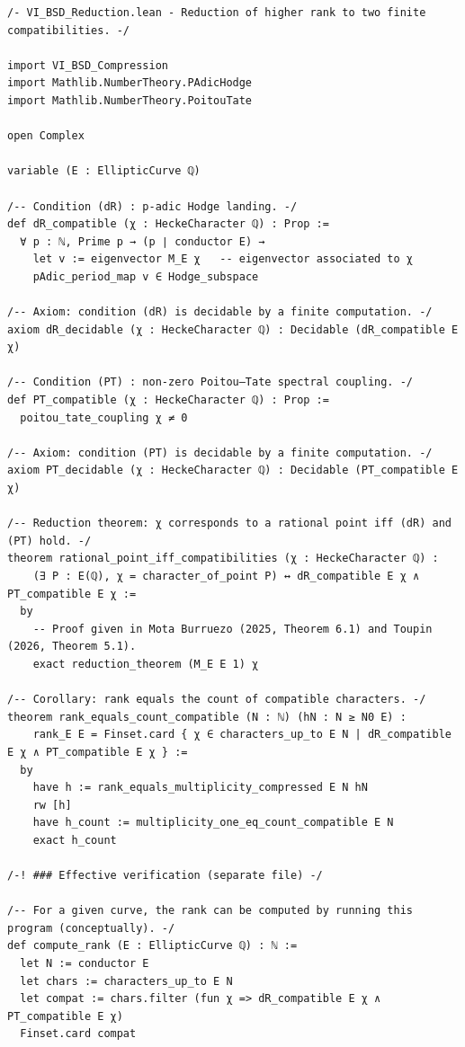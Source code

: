 \documentclass[11pt,a4paper]{article}
\begin{document}
\begin{lstlisting}[style=lean, caption={VI\_BSD\_Reduction.lean}]
/- VI_BSD_Reduction.lean - Reduction of higher rank to two finite compatibilities. -/

import VI_BSD_Compression
import Mathlib.NumberTheory.PAdicHodge
import Mathlib.NumberTheory.PoitouTate

open Complex

variable (E : EllipticCurve ℚ)

/-- Condition (dR) : p-adic Hodge landing. -/
def dR_compatible (χ : HeckeCharacter ℚ) : Prop :=
  ∀ p : ℕ, Prime p → (p ∣ conductor E) →
    let v := eigenvector M_E χ   -- eigenvector associated to χ
    pAdic_period_map v ∈ Hodge_subspace

/-- Axiom: condition (dR) is decidable by a finite computation. -/
axiom dR_decidable (χ : HeckeCharacter ℚ) : Decidable (dR_compatible E χ)

/-- Condition (PT) : non‑zero Poitou–Tate spectral coupling. -/
def PT_compatible (χ : HeckeCharacter ℚ) : Prop :=
  poitou_tate_coupling χ ≠ 0

/-- Axiom: condition (PT) is decidable by a finite computation. -/
axiom PT_decidable (χ : HeckeCharacter ℚ) : Decidable (PT_compatible E χ)

/-- Reduction theorem: χ corresponds to a rational point iff (dR) and (PT) hold. -/
theorem rational_point_iff_compatibilities (χ : HeckeCharacter ℚ) :
    (∃ P : E(ℚ), χ = character_of_point P) ↔ dR_compatible E χ ∧ PT_compatible E χ :=
  by
    -- Proof given in Mota Burruezo (2025, Theorem 6.1) and Toupin (2026, Theorem 5.1).
    exact reduction_theorem (M_E E 1) χ

/-- Corollary: rank equals the count of compatible characters. -/
theorem rank_equals_count_compatible (N : ℕ) (hN : N ≥ N0 E) :
    rank_E E = Finset.card { χ ∈ characters_up_to E N | dR_compatible E χ ∧ PT_compatible E χ } :=
  by
    have h := rank_equals_multiplicity_compressed E N hN
    rw [h]
    have h_count := multiplicity_one_eq_count_compatible E N
    exact h_count

/-! ### Effective verification (separate file) -/

/-- For a given curve, the rank can be computed by running this program (conceptually). -/
def compute_rank (E : EllipticCurve ℚ) : ℕ :=
  let N := conductor E
  let chars := characters_up_to E N
  let compat := chars.filter (fun χ => dR_compatible E χ ∧ PT_compatible E χ)
  Finset.card compat
\end{lstlisting}
\end{document}

